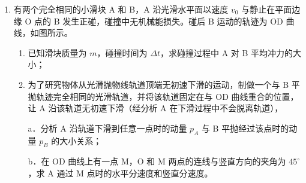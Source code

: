 \documentclass[\gkver]{gaokaozhenti}
\begin{document}
\begin{enumerate}



\item
有两个完全相同的小滑块 A 和 B，A 沿光滑水平面以速度 $v_{0}$ 与静止在平面边缘 O 点的 B 发生正碰，碰撞中无机械能损失。碰后 B 运动的轨迹为 OD 曲线，如图所示。

\begin{enumerate}
	\item
	已知滑块质量为 $m$，碰撞时间为 $\Delta t$，求碰撞过程中 A 对 B 平均冲力的大小；
	\item
	为了研究物体从光滑抛物线轨道顶端无初速下滑的运动，制做一个与 B 平抛轨迹完全相同的光滑轨道，并将该轨道固定在与 OD 曲线重合的位置，让 A 沿该轨道无初速下滑（经分析 A 在下滑过程中不会脱离轨道），
	
	a．分析 A 沿轨道下滑到任意一点时的动量 $p_{A}$ 与 B 平抛经过该点时的动量 $p_{B}$ 的大小关系；
	
	b．在 OD 曲线上有一点 M，O 和 M 两点的连线与竖直方向的夹角为 $45^{\circ}$，求 A 通过 M 点时的水平分速度和竖直分速度。
\end{enumerate}


\end{enumerate}
\end{document}
